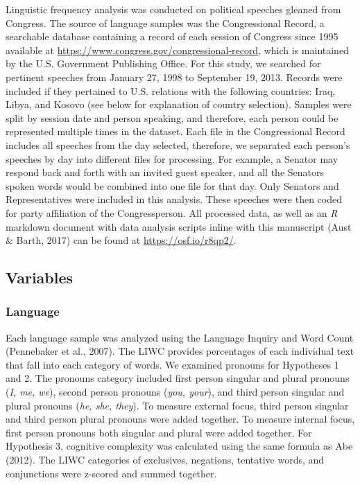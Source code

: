 \documentclass[english,,man]{apa6}
\begin{document}
Linguistic frequency analysis was conducted on political speeches gleaned from Congress. The source of language samples was the Congressional Record, a searchable database containing a record of each session of Congress since 1995 available at \url{https://www.congress.gov/congressional-record}, which is maintained by the U.S. Government Publishing Office. For this study, we searched for pertinent speeches from January 27, 1998 to September 19, 2013. Records were included if they pertained to U.S. relations with the following countries: Iraq, Libya, and Kosovo (see below for explanation of country selection). Samples were split by session date and person speaking, and therefore, each person could be represented multiple times in the dataset. Each file in the Congressional Record includes all speeches from the day selected, therefore, we separated each person's speeches by day into different files for processing. For example, a Senator may respond back and forth with an invited guest speaker, and all the Senators spoken words would be combined into one file for that day. Only Senators and Representatives were included in this analysis. These speeches were then coded for party affiliation of the Congressperson. All processed data, as well as an \emph{R} markdown document with data analysis scripts inline with this manuscript (Aust \& Barth, 2017) can be found at \url{https://osf.io/r8qp2/}.

\hypertarget{variables}{%
\subsection{Variables}\label{variables}}

\hypertarget{language}{%
\subsubsection{Language}\label{language}}

Each language sample was analyzed using the Language Inquiry and Word Count (Pennebaker et al., 2007). The LIWC provides percentages of each individual text that fall into each category of words. We examined pronouns for Hypotheses 1 and 2. The pronouns category included first person singular and plural pronouns (\emph{I, me, we}), second person pronouns (\emph{you, your}), and third person singular and plural pronouns (\emph{he, she, they}). To measure external focus, third person singular and third person plural pronouns were added together. To measure internal focus, first person pronouns both singular and plural were added together. For Hypothesis 3, cognitive complexity was calculated using the same formula as Abe (2012). The LIWC categories of exclusives, negations, tentative words, and conjunctions were z-scored and summed together.
\end{document}
